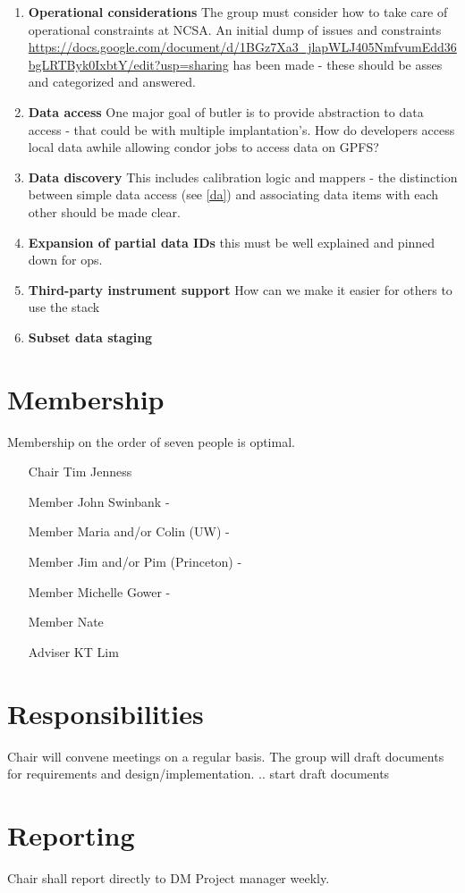 \begin{enumerate}
\item {\bf  Operational considerations}
The group must consider how to take care of operational constraints at NCSA.
An initial dump of issues and constraints \url{https://docs.google.com/document/d/1BGz7Xa3_jlapWLJ405NmfvumEdd36bgLRTByk0IxbtY/edit?usp=sharing} has been made - these should be asses and categorized and answered.

\item {\bf  Data access}\label{da}
One major goal  of butler is to provide abstraction to data access - that could be with multiple implantation's.
How do developers access local data awhile allowing condor jobs to access data on GPFS?

\item {\bf  Data discovery}
This includes  calibration logic and mappers - the distinction between simple data access (see \ref{da}) and associating data items with each other should be made clear.

\item {\bf  Expansion of partial data IDs } this must be well explained and pinned down for ops.

\item {\bf Third-party instrument support}  How can we make it easier for others to use the stack
\item {\bf  Subset data staging}
\end{enumerate}

\section{Membership}
Membership on the order of seven people is optimal.
\begin{itemize}
        \item[  Chair] Tim Jenness
\item [Member] John Swinbank
-\item [Member]  Maria and/or Colin (UW)
-\item [Member]  Jim and/or Pim (Princeton)
-\item [Member]  Michelle Gower
-\item [Member]  Nate
\item [Adviser] KT Lim
\end{itemize}

\section{Responsibilities }
            Chair will convene meetings on a regular basis. The group will draft documents for requirements
and design/implementation. .. start draft documents
\section{ Reporting}
           Chair shall report directly to  DM Project manager weekly.

